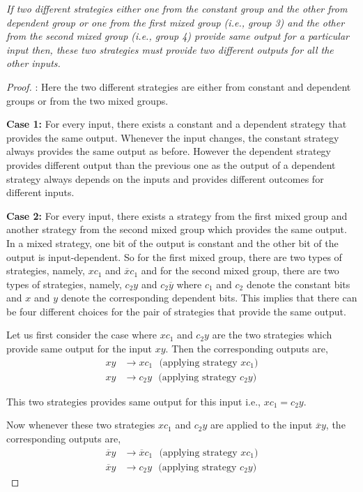 \documentclass[]{svjour3}
\begin{document}
\begin{theorem}
	\label{thm3}
	{\it If two different strategies either one from the constant group and the other from dependent group or one from the first mixed group (i.e., group 3) and the other from the second mixed group (i.e., group 4) provide same output for a particular input then, these two strategies must provide two different outputs for all the other inputs.}
\end{theorem} 

\begin{proof}
	:
	Here the two different strategies are either from constant and dependent groups or from the two mixed groups.
	
	\textbf{Case 1:} For every input, there exists a constant and a dependent strategy that provides the same output. Whenever the input changes, the constant strategy always provides the same output as before. However the dependent strategy provides different output than the previous one as the output of a dependent strategy always depends on the inputs and provides different outcomes for different inputs.
	
	\textbf{Case 2:} For every input, there exists a strategy from the first mixed group and another strategy from the second mixed group which provides the same output. In a mixed strategy, one bit of the output is constant and the other bit of the output is input-dependent. So for the first mixed group, there are two types of strategies, namely, $xc_1$ and $\overline{x}c_1$ and for the second mixed group, there are two types of strategies, namely, $c_2y$ and $c_2\overline{y}$ where $c_1$ and $c_2$ denote the constant bits and $x$ and $y$ denote the corresponding dependent bits. This implies that there can be four different choices for the pair of strategies that provide the same output. 
	
	Let us first consider the case where $xc_1$ and $c_2y$ are the two strategies which provide same output for the input $xy$. Then the corresponding outputs are,
	\begin{align*}
	xy &\rightarrow xc_1 ~~~\text{(applying strategy $xc_1$)}\\
	xy &\rightarrow c_2y ~~~\text{(applying strategy $c_2y$)}
	\end{align*}
	
	This two strategies provides same output for this input i.e., $xc_1 = c_2y$.
	
	Now whenever these two strategies $xc_1$ and $c_2y$ are applied to the input $\overline{x}y$, the corresponding outputs are,
	\begin{align*}
	\overline{x}y &\rightarrow \overline{x}c_1 ~~~\text{(applying strategy $xc_1$)}\\
	\overline{x}y &\rightarrow c_2y ~~~\text{(applying strategy $c_2y$)}
	\end{align*}
	

\end{proof}
\end{document}
